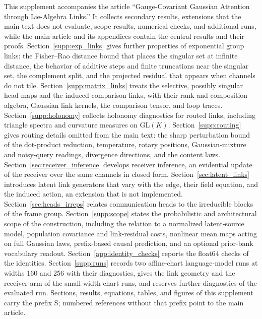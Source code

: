 \documentclass[twoside,11pt]{article}
\begin{document}
This supplement accompanies the article ``Gauge-Covariant Gaussian Attention through Lie-Algebra Links.'' It collects secondary results, extensions that the main text does not evaluate, scope results, numerical checks, and additional runs, while the main article and its appendices contain the central results and their proofs. Section~\ref{supp:exp_links} gives further properties of exponential group links: the Fisher--Rao distance bound that places the singular set at infinite distance, the behavior of additive steps and finite truncations near the singular set, the complement split, and the projected residual that appears when channels do not tile. Section~\ref{supp:matrix_links} treats the selective, possibly singular head maps and the induced comparison links, with their rank and composition algebra, Gaussian link kernels, the comparison tensor, and loop traces. Section~\ref{supp:holonomy} collects holonomy diagnostics for routed links, including triangle spectra and curvature measures on $\mathrm{GL}(K)$. Section~\ref{supp:routing} gives routing details omitted from the main text: the sharp perturbation bound of the dot-product reduction, temperature, rotary positions, Gaussian-mixture and noisy-query readings, divergence directions, and the content laws. Section~\ref{sec:receiver_inference} develops receiver inference, an evidential update of the receiver over the same channels in closed form. Section~\ref{sec:latent_links} introduces latent link generators that vary with the edge, their field equation, and the induced action, an extension that is not implemented. Section~\ref{sec:heads_irreps} relates communication heads to the irreducible blocks of the frame group. Section~\ref{supp:scope} states the probabilistic and architectural scope of the construction, including the relation to a normalized latent-source model, population covariance and link-residual costs, nonlinear mean maps acting on full Gaussian laws, prefix-based causal prediction, and an optional prior-bank vocabulary readout. Section~\ref{app:identity_checks} reports the float64 checks of the identities. Section~\ref{supp:runs} records two affine-chart language-model runs at widths 160 and 256 with their diagnostics, gives the link geometry and the receiver arm of the small-width chart runs, and reserves further diagnostics of the evaluated run. Sections, results, equations, tables, and figures of this supplement carry the prefix S; numbered references without that prefix point to the main article.

\end{document}
